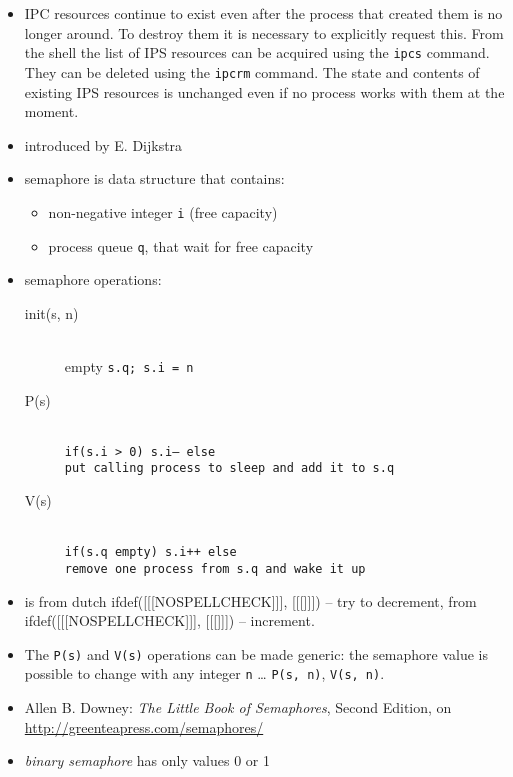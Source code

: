 \begin{itemize}
\item IPC resources continue to exist even after the process that created them
is no longer around. To destroy them it is necessary to explicitly request this.
From the shell the list of IPS resources can be acquired using 
the \texttt{ipcs} command. They can be deleted using the \texttt{ipcrm} command.
The state and contents of existing IPS resources is unchanged even if no process
works with them at the moment.
\end{itemize}


\begin{slide}
\begin{itemize}
\item introduced by E. Dijkstra
\item semaphore is data structure that contains:
    \begin{itemize}
    \item non-negative integer \texttt{i} (free capacity) 
    \item process queue \texttt{q}, that wait for free capacity
    \end{itemize}
\item semaphore operations: 
    \begin{description}
    \item [init(s, n)]~\\
    empty \texttt{s.q; s.i = n}
    \item [P(s)]~\\
    \texttt{if(s.i > 0) s.i-- else\\
    put calling process to sleep and add it to s.q }
    \item [V(s)]~\\
    \texttt{if(s.q empty) s.i++ else\\
    remove one process from s.q and wake it up}
    \end{description}
\end{itemize}
\end{slide}

\begin{itemize}
\item {} is from dutch ifdef([[[NOSPELLCHECK]]],
[[[]]]) -- try to
decrement,  from ifdef([[[NOSPELLCHECK]]], [[[]]])
-- increment.
\item The \texttt{P(s)} and \texttt{V(s)} operations can be made generic:
the semaphore value is possible to change with any integer
\texttt{n} \dots{} \texttt{P(s,~n)}, \texttt{V(s,~n)}.
\item Allen B. Downey: \emph{The Little Book of Semaphores}, Second Edition,
on \url{http://greenteapress.com/semaphores/}
\item \emph{binary semaphore} has only values 0 or 1
\end{itemize}

